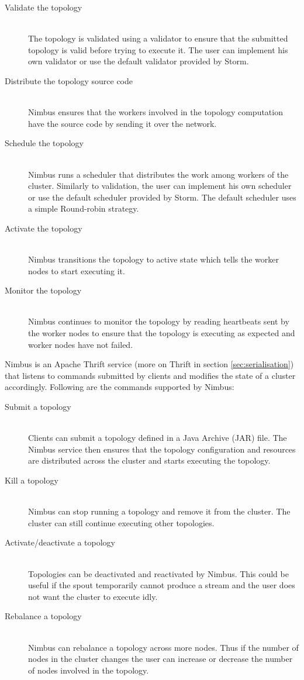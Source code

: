 \documentclass[bsc,logo,frontabs,twoside,singlespacing,normalheadings,parskip]{infthesis}     %
\begin{document}
\begin{description}
	\item[Validate the topology] \hfill \\
	The topology is validated using a validator to ensure that the submitted topology is valid before trying to execute it. The user can implement his own validator or use the default validator provided by Storm.
	\item[Distribute the topology source code] \hfill \\
	Nimbus ensures that the workers involved in the topology computation have the source code by sending it over the network.
	\item[Schedule the topology] \hfill \\
	Nimbus runs a scheduler that distributes the work among workers of the cluster. Similarly to validation, the user can implement his own scheduler or use the default scheduler provided by Storm. The default scheduler uses a simple Round-robin strategy.
	\item[Activate the topology] \hfill \\
	Nimbus transitions the topology to active state which tells the worker nodes to start executing it.
	\item[Monitor the topology] \hfill \\
	Nimbus continues to monitor the topology by reading heartbeats sent by the worker nodes to ensure that the topology is executing as expected and worker nodes have not failed.
\end{description}


Nimbus is an Apache Thrift \cite{ApacheThrift} service (more on Thrift in section \ref{sec:serialisation}) that listens to commands submitted by clients and modifies the state of a cluster accordingly. Following are the commands supported by Nimbus:

\begin{description}
	\item[Submit a topology] \hfill \\
	Clients can submit a topology defined in a Java Archive (JAR) file. The Nimbus service then ensures that the topology configuration and resources are distributed across the cluster and starts executing the topology.
	\item[Kill a topology] \hfill \\
	Nimbus can stop running a topology and remove it from the cluster. The cluster can still continue executing other topologies.
	\item[Activate/deactivate a topology] \hfill \\
	Topologies can be deactivated and reactivated by Nimbus. This could be useful if the spout temporarily cannot produce a stream and the user does not want the cluster to execute idly.
	\item[Rebalance a topology] \hfill \\
	Nimbus can rebalance a topology across more nodes. Thus if the number of nodes in the cluster changes the user can increase or decrease the number of nodes involved in the topology.
\end{description}
\end{document}
